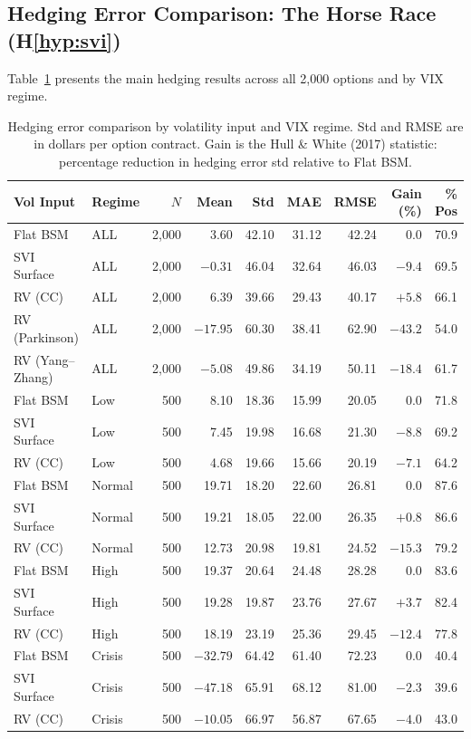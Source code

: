 \documentclass[12pt, letterpaper]{article}
\begin{document}
\subsection{Hedging Error Comparison: The Horse Race (H\ref{hyp:svi})}
\label{sec:horse_race}

Table~\ref{tab:hedging_main} presents the main hedging results across all 2,000 options and by VIX regime.

\begin{table}[H]
\centering
\caption{Hedging error comparison by volatility input and VIX regime. Std and RMSE are in dollars per option contract. Gain is the Hull \& White (2017) statistic: percentage reduction in hedging error std relative to Flat BSM.}
\label{tab:hedging_main}
\small
\begin{tabular}{llrrrrrrr}
\toprule
Vol Input & Regime & $N$ & Mean & Std & MAE & RMSE & Gain (\%) & \% Pos \\
\midrule
Flat BSM        & ALL     & 2,000 & 3.60  & 42.10 & 31.12 & 42.24 & 0.0    & 70.9 \\
SVI Surface     & ALL     & 2,000 & $-0.31$ & 46.04 & 32.64 & 46.03 & $-9.4$  & 69.5 \\
RV (CC)         & ALL     & 2,000 & 6.39  & 39.66 & 29.43 & 40.17 & $+5.8$  & 66.1 \\
RV (Parkinson)  & ALL     & 2,000 & $-17.95$ & 60.30 & 38.41 & 62.90 & $-43.2$ & 54.0 \\
RV (Yang--Zhang) & ALL    & 2,000 & $-5.08$ & 49.86 & 34.19 & 50.11 & $-18.4$ & 61.7 \\
\midrule
Flat BSM        & Low     & 500 & 8.10  & 18.36 & 15.99 & 20.05 & 0.0    & 71.8 \\
SVI Surface     & Low     & 500 & 7.45  & 19.98 & 16.68 & 21.30 & $-8.8$  & 69.2 \\
RV (CC)         & Low     & 500 & 4.68  & 19.66 & 15.66 & 20.19 & $-7.1$  & 64.2 \\
\midrule
Flat BSM        & Normal  & 500 & 19.71 & 18.20 & 22.60 & 26.81 & 0.0    & 87.6 \\
SVI Surface     & Normal  & 500 & 19.21 & 18.05 & 22.00 & 26.35 & $+0.8$  & 86.6 \\
RV (CC)         & Normal  & 500 & 12.73 & 20.98 & 19.81 & 24.52 & $-15.3$ & 79.2 \\
\midrule
Flat BSM        & High    & 500 & 19.37 & 20.64 & 24.48 & 28.28 & 0.0    & 83.6 \\
SVI Surface     & High    & 500 & 19.28 & 19.87 & 23.76 & 27.67 & $+3.7$  & 82.4 \\
RV (CC)         & High    & 500 & 18.19 & 23.19 & 25.36 & 29.45 & $-12.4$ & 77.8 \\
\midrule
Flat BSM        & Crisis  & 500 & $-32.79$ & 64.42 & 61.40 & 72.23 & 0.0    & 40.4 \\
SVI Surface     & Crisis  & 500 & $-47.18$ & 65.91 & 68.12 & 81.00 & $-2.3$  & 39.6 \\
RV (CC)         & Crisis  & 500 & $-10.05$ & 66.97 & 56.87 & 67.65 & $-4.0$  & 43.0 \\
\bottomrule
\end{tabular}
\end{table}
\end{document}
